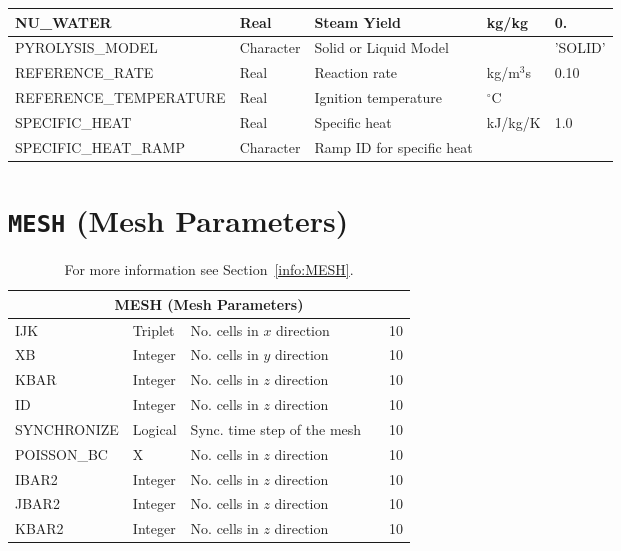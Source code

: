 \documentclass[11pt]{book}
\begin{document}
\begin{table}[H]
\begin{tabular*}{\textwidth}{@{\extracolsep{\fill}}|l|l|l|l|l|}
{\ct NU\_WATER  }             & Real        & Steam Yield                 & kg/kg               & 0.     \\ \hline
{\ct PYROLYSIS\_MODEL}        & Character   & Solid or Liquid Model       &                     & {\ct 'SOLID'} \\ \hline
{\ct REFERENCE\_RATE}         & Real        & Reaction rate               & kg/m$^3$s           & 0.10   \\ \hline
{\ct REFERENCE\_TEMPERATURE}  & Real        & Ignition temperature        & $^\circ$C           &        \\ \hline
{\ct SPECIFIC\_HEAT}          & Real        & Specific heat               & kJ/kg/K             & 1.0    \\ \hline
{\ct SPECIFIC\_HEAT\_RAMP}    & Character   & Ramp ID for specific heat   &                     &        \\ \hline
\end{tabular*}
\end{table}

\vspace{\baselineskip}

\vfill

\clearpage
\section{\texorpdfstring{{\tt MESH}}{MESH} (Mesh Parameters)}

\hspace{1in}

\begin{table}[H]
\caption{For more information see Section~\ref{info:MESH}.}\label{tbl:MESH}
\noindent
\begin{tabular*}{\textwidth}{@{\extracolsep{\fill}}|l|l|l|l|l|}
\hline
\multicolumn{5}{|c|}{{\ct MESH} (Mesh Parameters)} \\ \hline \hline
{\ct IJK}         & Triplet     & No. cells in $x$ direction  &    & 10  \\ \hline
{\ct XB}          & Integer     & No. cells in $y$ direction  &    & 10  \\ \hline
{\ct KBAR}        & Integer     & No. cells in $z$ direction  &    & 10  \\ \hline
{\ct ID}          & Integer     & No. cells in $z$ direction  &    & 10  \\ \hline
{\ct SYNCHRONIZE} & Logical     & Sync. time step of the mesh &    & 10  \\ \hline
{\ct POISSON\_BC} & X           & No. cells in $z$ direction  &    & 10  \\ \hline
{\ct IBAR2}       & Integer     & No. cells in $z$ direction  &    & 10  \\ \hline
{\ct JBAR2}       & Integer     & No. cells in $z$ direction  &    & 10  \\ \hline
{\ct KBAR2}       & Integer     & No. cells in $z$ direction  &    & 10  \\ \hline
\end{tabular*}
\end{table}
\end{document}
